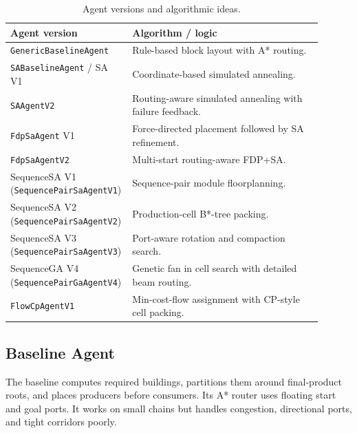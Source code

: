 \documentclass[11pt,a4paper]{article}
\begin{document}
\begin{table}[H]
    \centering
    \caption{Agent versions and algorithmic ideas.}
    \label{tab:agent-versions}
    \begin{tabular}{L{0.30\linewidth} L{0.60\linewidth}}
        \toprule
        Agent version & Algorithm / logic \\
        \midrule
        \texttt{GenericBaselineAgent} &
        Rule-based block layout with A* routing. \\
        \addlinespace
        \texttt{SABaselineAgent} / SA V1 &
        Coordinate-based simulated annealing. \\
        \addlinespace
        \texttt{SAAgentV2} &
        Routing-aware simulated annealing with failure feedback. \\
        \addlinespace
        \texttt{FdpSaAgent} V1 &
        Force-directed placement followed by SA refinement. \\
        \addlinespace
        \texttt{FdpSaAgentV2} &
        Multi-start routing-aware FDP+SA. \\
        \addlinespace
        SequenceSA V1 (\texttt{SequencePairSaAgentV1}) &
        Sequence-pair module floorplanning. \\
        \addlinespace
        SequenceSA V2 (\texttt{SequencePairSaAgentV2}) &
        Production-cell B*-tree packing. \\
        \addlinespace
        SequenceSA V3 (\texttt{SequencePairSaAgentV3}) &
        Port-aware rotation and compaction search. \\
        \addlinespace
        SequenceGA V4 (\texttt{SequencePairGaAgentV4}) &
        Genetic fan in cell search with detailed beam routing. \\
        \addlinespace
        \texttt{FlowCpAgentV1} &
        Min-cost-flow assignment with CP-style cell packing. \\
        \bottomrule
    \end{tabular}
\end{table}

\subsection{Baseline Agent}

The baseline computes required buildings, partitions them around final-product roots, and places producers before consumers. Its A* router uses floating start and goal ports. It works on small chains but handles congestion, directional ports, and tight corridors poorly.
\end{document}
